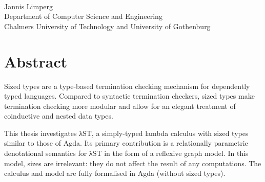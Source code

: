 
\thispagestyle{plain}			%

\begingroup
\setlength{\parindent}{0pt}

\oneLineTitle\\
Jannis Limperg\\
Department of Computer Science and Engineering\\
Chalmers University of Technology and University of Gothenburg

\endgroup

\section*{Abstract}

Sized types are a type-based termination checking mechanism for dependently
typed languages. Compared to syntactic termination checkers, sized types make
termination checking more modular and allow for an elegant treatment of
coinductive and nested data types.

This thesis investigates λST, a simply-typed lambda calculus with sized types
similar to those of Agda. Its primary contribution is a relationally parametric
denotational semantics for λST in the form of a reflexive graph model. In this
model, sizes are irrelevant: they do not affect the result of any computations.
The calculus and model are fully formalised in Agda (without sized types).




\newpage				%
\thispagestyle{empty}
\mbox{}